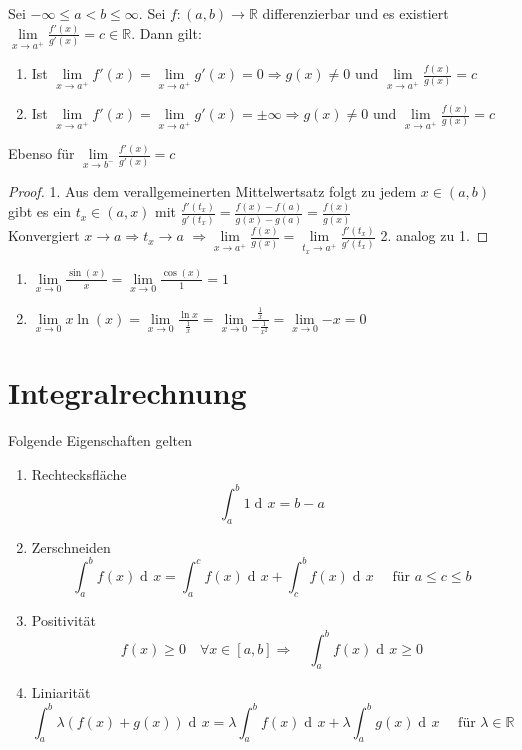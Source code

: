 \documentclass[a4paper,titlepage,oneside]{article}
\def\R{\ensuremath{\mathbb{R}} }
\newcommand{\der}{\operatorname{d\!}{}}
\def\fa{\ensuremath{\forall}}
\newcommand{\limnull}[2][n]{\ensuremath{\lim\limits_{#1 \rightarrow 0}{#2}}}
\newcommand{\limpos}[3][n]{\ensuremath{\lim\limits_{#1 \rightarrow #2^+}{#3}}}
\newcommand{\limneg}[3][n]{\ensuremath{\lim\limits_{#1 \rightarrow #2^-}{#3}}}
\newcommand{\integral}[4][x]{\ensuremath{\int_{#2}^{#3}{#4\der #1}}}
\newcommand{\intAB}[2][x]{\integral[#1]{a}{b}{#2}}
\theoremstyle{thmstyle}
\begin{document}
\begin{satz}
Sei $-\infty \le a < b \le \infty$. Sei $f : (a,b) \to \R $ differenzierbar und es existiert $\limpos[x]{a}{\frac{f'(x)}{g'(x)}} = c \in \R$.
Dann gilt: 
\begin{enumerate}
\item Ist $\limpos[x]{a}{f'(x)} = \limpos[x]{a}{g'(x)} = 0 \Rightarrow g(x) \ne 0 \text{ und } \limpos[x]{a}{\frac{f(x)}{g(x)}} = c$
\item Ist $\limpos[x]{a}{f'(x)} = \limpos[x]{a}{g'(x)} = \pm \infty \Rightarrow g(x) \ne 0 \text{ und } \limpos[x]{a}{\frac{f(x)}{g(x)}} = c$
\end{enumerate}
Ebenso für $\limneg[x]{b}{\frac{f'(x)}{g'(x)}} = c$
\begin{proof}
1. Aus dem verallgemeinerten Mittelwertsatz folgt zu jedem $x \in (a,b)$ gibt es ein $t_x \in (a,x)$ mit $\frac{f'(t_x)}{g'(t_x)} = \frac{f(x) - f(a)}{g(x) - g(a)} = \frac{f(x)}{g(x)}$\\
Konvergiert $x \to a \Rightarrow  t_x \to a$
$\Rightarrow \limpos[x]{a}{\frac{f(x)}{g(x)}} = \limpos[t_x]{a}{\frac{f'(t_x)}{g'(t_x)}}$
2. analog zu 1. 
\end{proof}
\end{satz}

\begin{bsp}
\begin{enumerate}
\item $ \limnull[x]{\frac{\sin(x)}{x}} = \limnull[x]{\frac{\cos(x)}{1}} = 1$
\item $ \limnull[x]{x \ln(x)} = \limnull[x]{\frac{\ln x}{\frac{1}{x}}} = \limnull[x]{\frac{\frac{1}{x}}{-\frac{1}{x^2}}} = \limnull[x]{-x} = 0$
\end{enumerate}
\end{bsp}

\newpage
\section{Integralrechnung}

Folgende Eigenschaften gelten
\begin{enumerate}
\item Rechtecksfläche \[  \intAB{1} = b - a\]
\item Zerschneiden \[  \intAB{f(x)} = \integral{a}{c}{f(x)} + \integral{c}{b}{f(x)} \quad \text{ für } a \le c \le b \]
\item Positivität \[ f(x) \ge 0 \quad \fa x \in [a,b] \Rightarrow \quad \intAB{f(x)} \ge 0\]
\item Liniarität \[\intAB{\lambda (f(x) + g(x))} = \lambda \intAB{f(x)} + \lambda \intAB{g(x)} \quad \text{ für } \lambda \in \R\]
\end{enumerate}
\end{document}
